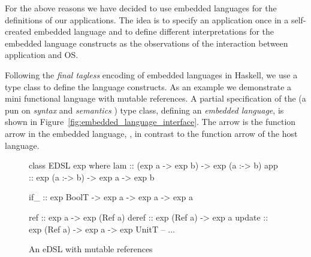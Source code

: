 For the above reasons we have decided to use embedded languages for the definitions of our applications.
The idea is to specify an application once in a self-created embedded language and to define different interpretations for the embedded language constructs as the observations of the interaction between application and OS\nolinebreak[3]  \cite{Hofer:2008:PED:1449913.1449935}.

Following the \emph{final tagless} \cite{final_tagless_embedding} encoding of embedded languages in Haskell, we use a type class to define the language constructs.
As an example we demonstrate a mini functional language with mutable references.
A partial specification of the  (a pun on \emph{syntax} and \emph{semantics} \cite{final_tagless_embedding}) type class, defining an \emph{embedded language}, is shown in Figure~\ref{fig:embedded_language_interface}.
The arrow \hs{:->} is the function arrow in the embedded language, \eg {}, in contrast to the function arrow \hs{->} of the host language.




\begin{figure}
\begin{code}
class EDSL exp where
     lam :: (exp a -> exp b) -> exp (a :-> b)
     app :: exp (a :-> b) -> exp a -> exp b

     if_ :: exp BoolT -> exp a -> exp a -> exp a

     ref :: exp a -> exp (Ref a)
     deref :: exp (Ref a) -> exp a
     update :: exp (Ref a) -> exp a -> exp UnitT
     -- ...
\end{code}
\caption{An eDSL with mutable references}
\label{fig:edsl-mutref}
\end{figure}

